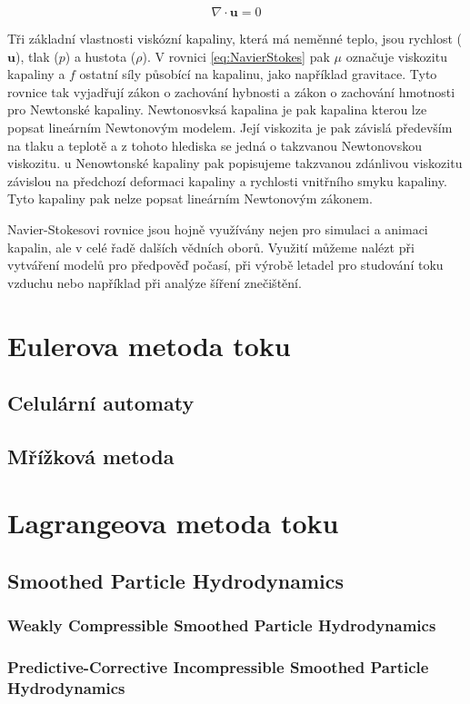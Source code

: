 \begin{equation}
	\nabla \cdot \mathbf{u} = 0
	\label{eq:NavierStokes2}
\end{equation}

Tři základní vlastnosti viskózní kapaliny, která má neměnné teplo, jsou rychlost ($\mathbf{u}$), tlak ($p$) a hustota ($\rho$). V rovnici \ref{eq:NavierStokes} pak $\mu$ označuje viskozitu kapaliny a $f$ ostatní síly působící na kapalinu, jako například gravitace. Tyto rovnice tak vyjadřují zákon o zachování hybnosti a zákon o zachování hmotnosti pro Newtonské kapaliny. Newtonosvksá kapalina je pak kapalina kterou lze popsat lineárním Newtonovým modelem. Její viskozita je pak závislá především na tlaku a teplotě a z tohoto hlediska se jedná o takzvanou Newtonovskou viskozitu. u Nenowtonské kapaliny pak popisujeme takzvanou zdánlivou viskozitu závislou na předchozí deformaci kapaliny a rychlosti vnitřního smyku kapaliny. Tyto kapaliny pak nelze popsat lineárním Newtonovým zákonem.\cite{StejskalJan2013Pmks}

Navier-Stokesovi rovnice jsou hojně využívány nejen pro simulaci a animaci kapalin, ale v celé řadě dalších vědních oborů. Využití můžeme nalézt při vytváření modelů pro předpověď počasí, při výrobě letadel pro studování toku vzduchu nebo například při analýze šíření znečištění.

\section{Eulerova metoda toku}
\subsection{Celulární automaty}
\subsection{Mřížková metoda}
\section{Lagrangeova metoda toku}
\subsection{Smoothed Particle Hydrodynamics}
\subsubsection{Weakly Compressible Smoothed Particle Hydrodynamics}
\subsubsection{Predictive-Corrective Incompressible Smoothed Particle Hydrodynamics}
